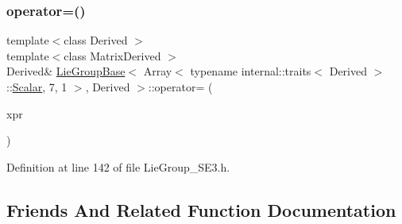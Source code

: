 \subsubsection{\texorpdfstring{operator=()}{operator=()}\hspace{0.1cm}{\footnotesize\ttfamily [5/5]}}
{\footnotesize\ttfamily template$<$class Derived $>$ \\
template$<$class Matrix\+Derived $>$ \\
Derived\& \hyperlink{class_lie_group_base}{Lie\+Group\+Base}$<$ Array$<$ typename internal\+::traits$<$ Derived $>$\+::\hyperlink{class_lie_group_base_3_01_array_3_01typename_01internal_1_1traits_3_01_derived_01_4_1_1_scalar_0d6d4b5459662fc32c7117aee50362fb1_a831695c575380c9a1df32eff9fc4a8c6}{Scalar}, 7, 1 $>$, Derived $>$\+::operator= (\begin{DoxyParamCaption}\item[{const Matrix\+Base$<$ Matrix\+Derived $>$ \&}]{xpr }\end{DoxyParamCaption})\hspace{0.3cm}{\ttfamily [inline]}}



Definition at line 142 of file Lie\+Group\+\_\+\+S\+E3.\+h.



\subsection{Friends And Related Function Documentation}
\hypertarget{class_lie_group_base_3_01_array_3_01typename_01internal_1_1traits_3_01_derived_01_4_1_1_scalar_0d6d4b5459662fc32c7117aee50362fb1_ac04a80c43e9803f7e73b6dc0fd85d184}{}\label{class_lie_group_base_3_01_array_3_01typename_01internal_1_1traits_3_01_derived_01_4_1_1_scalar_0d6d4b5459662fc32c7117aee50362fb1_ac04a80c43e9803f7e73b6dc0fd85d184} 
